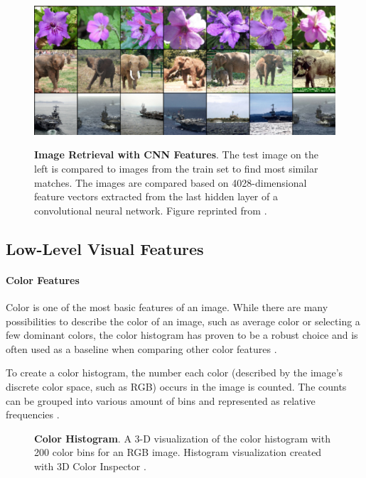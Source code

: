 \documentclass[12pt]{report}
\begin{document}
\begin{figure}[h]
\centering
{\includegraphics[width=\linewidth]{02_background/CBIR/cnn_cbir}}
\caption{\label{fig:conv_cbir} \textbf{Image Retrieval with CNN Features}. The test image on the left is compared to images from the train set to find most similar matches. The images are compared based on 4028-dimensional feature vectors extracted from the last hidden layer of a convolutional neural network. Figure reprinted from \cite{NIPS2012_4824}.}
\end{figure}


\pagebreak
\subsection{Low-Level Visual Features}

\paragraph{Color Features}
Color is one of the most basic features of an image. While there are many possibilities to describe the color of an image, such as average color or selecting a few dominant colors, the color histogram has proven to be a robust choice and is often used as a baseline when comparing other color features \cite{Torres_content-basedimage}.

To create a color histogram, the number each color (described by the image's discrete color space, such as RGB) occurs in the image is counted. The counts can be grouped into various amount of bins and represented as relative frequencies \cite{Swain1991}.

\begin{figure}[h]
\centering
{}
\caption{\label{fig:color_hist} \textbf{Color Histogram}. A 3-D visualization of the color histogram with 200 color bins for an RGB image. Histogram visualization created with 3D Color Inspector \cite{barthel_3d_nodate}.}
\end{figure}
\end{document}
